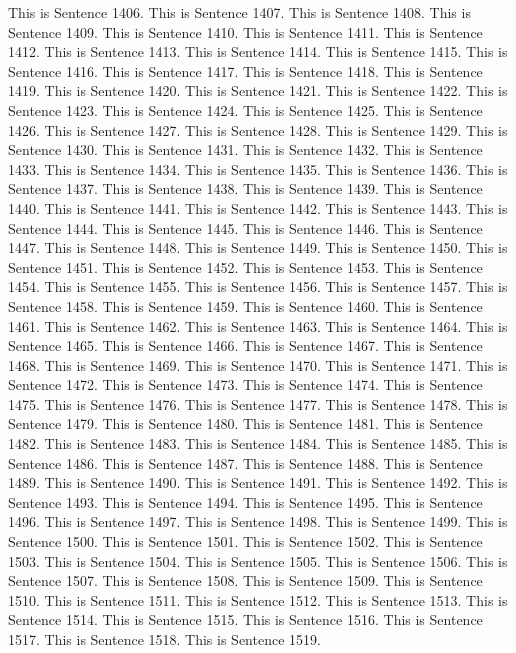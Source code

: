 \documentclass{article}
\begin{document}
This is Sentence 1406.
This is Sentence 1407.
This is Sentence 1408.
This is Sentence 1409.
This is Sentence 1410.
This is Sentence 1411.
This is Sentence 1412.
This is Sentence 1413.
This is Sentence 1414.
This is Sentence 1415.
This is Sentence 1416.
This is Sentence 1417.
This is Sentence 1418.
This is Sentence 1419.
This is Sentence 1420.
This is Sentence 1421.
This is Sentence 1422.
This is Sentence 1423.
This is Sentence 1424.
This is Sentence 1425.
This is Sentence 1426.
This is Sentence 1427.
This is Sentence 1428.
This is Sentence 1429.
This is Sentence 1430.
This is Sentence 1431.
This is Sentence 1432.
This is Sentence 1433.
This is Sentence 1434.
This is Sentence 1435.
This is Sentence 1436.
This is Sentence 1437.
This is Sentence 1438.
This is Sentence 1439.
This is Sentence 1440.
This is Sentence 1441.
This is Sentence 1442.
This is Sentence 1443.
This is Sentence 1444.
This is Sentence 1445.
This is Sentence 1446.
This is Sentence 1447.
This is Sentence 1448.
This is Sentence 1449.
This is Sentence 1450.
This is Sentence 1451.
This is Sentence 1452.
This is Sentence 1453.
This is Sentence 1454.
This is Sentence 1455.
This is Sentence 1456.
This is Sentence 1457.
This is Sentence 1458.
This is Sentence 1459.
This is Sentence 1460.
This is Sentence 1461.
This is Sentence 1462.
This is Sentence 1463.
This is Sentence 1464.
This is Sentence 1465.
This is Sentence 1466.
This is Sentence 1467.
This is Sentence 1468.
This is Sentence 1469.
This is Sentence 1470.
This is Sentence 1471.
This is Sentence 1472.
This is Sentence 1473.
This is Sentence 1474.
This is Sentence 1475.
This is Sentence 1476.
This is Sentence 1477.
This is Sentence 1478.
This is Sentence 1479.
This is Sentence 1480.
This is Sentence 1481.
This is Sentence 1482.
This is Sentence 1483.
This is Sentence 1484.
This is Sentence 1485.
This is Sentence 1486.
This is Sentence 1487.
This is Sentence 1488.
This is Sentence 1489.
This is Sentence 1490.
This is Sentence 1491.
This is Sentence 1492.
This is Sentence 1493.
This is Sentence 1494.
This is Sentence 1495.
This is Sentence 1496.
This is Sentence 1497.
This is Sentence 1498.
This is Sentence 1499.
This is Sentence 1500.
This is Sentence 1501.
This is Sentence 1502.
This is Sentence 1503.
This is Sentence 1504.
This is Sentence 1505.
This is Sentence 1506.
This is Sentence 1507.
This is Sentence 1508.
This is Sentence 1509.
This is Sentence 1510.
This is Sentence 1511.
This is Sentence 1512.
This is Sentence 1513.
This is Sentence 1514.
This is Sentence 1515.
This is Sentence 1516.
This is Sentence 1517.
This is Sentence 1518.
This is Sentence 1519.
\end{document}
